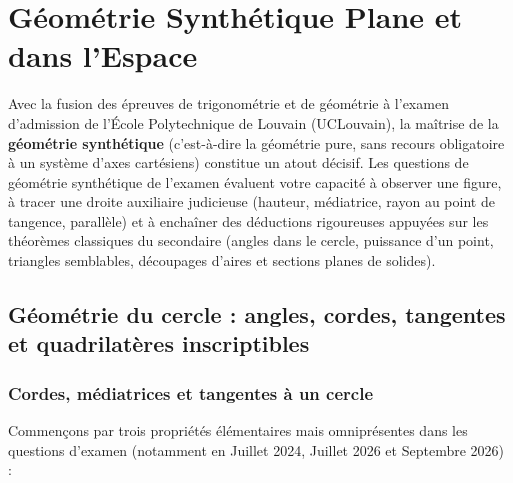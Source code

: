 \chapter[Géométrie Synthétique Plane et Spatiale]{Géométrie Synthétique Plane et dans l'Espace}

Avec la fusion des épreuves de trigonométrie et de géométrie à l'examen d'admission de l'École Polytechnique de Louvain (UCLouvain), la maîtrise de la \textbf{géométrie synthétique} (c'est-à-dire la géométrie pure, sans recours obligatoire à un système d'axes cartésiens) constitue un atout décisif. Les questions de géométrie synthétique de l'examen évaluent votre capacité à observer une figure, à tracer une droite auxiliaire judicieuse (hauteur, médiatrice, rayon au point de tangence, parallèle) et à enchaîner des déductions rigoureuses appuyées sur les théorèmes classiques du secondaire (angles dans le cercle, puissance d'un point, triangles semblables, découpages d'aires et sections planes de solides).

\section{Géométrie du cercle : angles, cordes, tangentes et quadrilatères inscriptibles}

\subsection{Cordes, médiatrices et tangentes à un cercle}

Commençons par trois propriétés élémentaires mais omniprésentes dans les questions d'examen (notamment en Juillet 2024, Juillet 2026 et Septembre 2026) :

